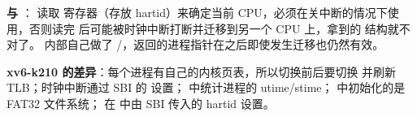 \textbf{ 与 }： 读取  寄存器（存放 hartid）来确定当前 CPU，必须在关中断的情况下使用，否则读完  后可能被时钟中断打断并迁移到另一个 CPU 上，拿到的  结构就不对了。 内部自己做了 /，返回的进程指针在之后即使发生迁移也仍然有效。

\textbf{xv6-k210 的差异}：每个进程有自己的内核页表，所以切换前后要切换  并刷新 TLB；时钟中断通过 SBI 的  设置； 中统计进程的 utime/stime； 中初始化的是 FAT32 文件系统； 在  中由 SBI 传入的 hartid 设置。
